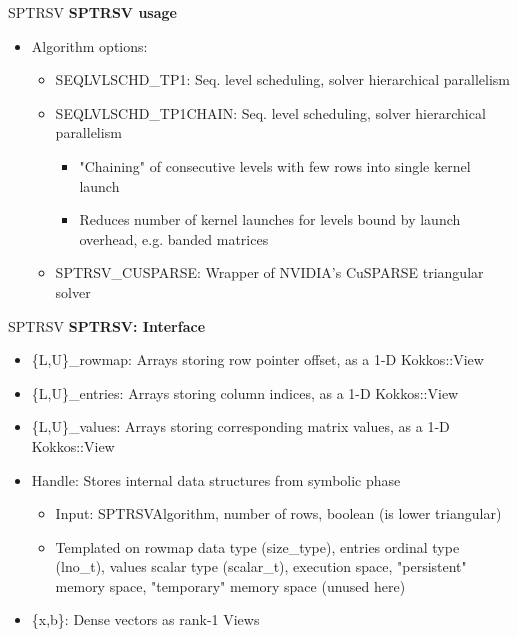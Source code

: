 \begin{frame}[fragile]{SPTRSV}
\textbf{SPTRSV usage}

  \begin{itemize}
      \item Algorithm options:
      \begin{itemize}
        \item SEQLVLSCHD\_TP1: Seq. level scheduling, solver hierarchical parallelism
        \item SEQLVLSCHD\_TP1CHAIN: Seq. level scheduling, solver hierarchical parallelism
        \begin{itemize}
          \item "Chaining" of consecutive levels with few rows into single kernel launch
          \item Reduces number of kernel launches for levels bound by launch overhead, e.g. banded matrices
        \end{itemize}
        \item SPTRSV\_CUSPARSE: Wrapper of NVIDIA's CuSPARSE triangular solver
      \end{itemize}
  \end{itemize}

\end{frame}


\begin{frame}[fragile]{SPTRSV}
\textbf{SPTRSV: Interface}
  \begin{itemize}
    \item \{L,U\}\_rowmap: Arrays storing row pointer offset, as a 1-D Kokkos::View
    \item \{L,U\}\_entries: Arrays storing column indices, as a 1-D Kokkos::View
    \item \{L,U\}\_values: Arrays storing corresponding matrix values, as a 1-D Kokkos::View
    \item Handle: Stores internal data structures from symbolic phase
    \begin{itemize}
      \item Input: SPTRSVAlgorithm, number of rows, boolean (is lower triangular)
      \item Templated on rowmap data type (size\_type), entries ordinal type (lno\_t), values scalar type (scalar\_t), execution space, "persistent" memory space, "temporary" memory space (unused here)
    \end{itemize}
    \item \{x,b\}: Dense vectors as rank-1 Views
  \end{itemize}

\end{frame}


